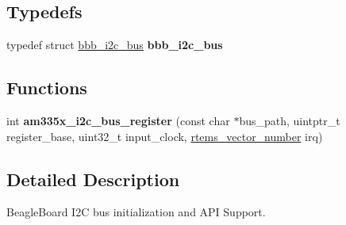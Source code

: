 \subsection*{Typedefs}
\begin{DoxyCompactItemize}
\item 
\mbox{\label{bbb-i2c_8c_a0d08ebd87f01a4e689b6f759b058f4f1}} 
typedef struct \mbox{\hyperlink{structbbb__i2c__bus}{bbb\+\_\+i2c\+\_\+bus}} {\bfseries bbb\+\_\+i2c\+\_\+bus}
\end{DoxyCompactItemize}
\subsection*{Functions}
\begin{DoxyCompactItemize}
\item 
\mbox{\label{bbb-i2c_8c_a25efeb4aa39c6f4fd1aa00b192137600}} 
int {\bfseries am335x\+\_\+i2c\+\_\+bus\+\_\+register} (const char $\ast$bus\+\_\+path, uintptr\+\_\+t register\+\_\+base, uint32\+\_\+t input\+\_\+clock, \mbox{\hyperlink{group__ClassicINTR_ga3e434c197d99f128e78cae4d9358bd8b}{rtems\+\_\+vector\+\_\+number}} irq)
\end{DoxyCompactItemize}


\subsection{Detailed Description}
Beagle\+Board I2C bus initialization and A\+PI Support. 

